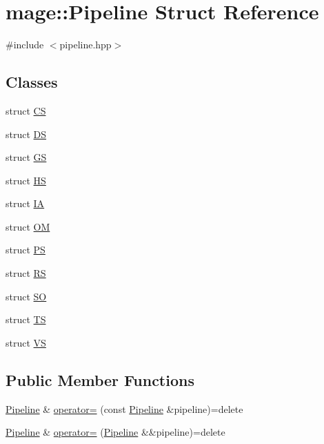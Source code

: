 \hypertarget{structmage_1_1_pipeline}{}\section{mage\+:\+:Pipeline Struct Reference}
\label{structmage_1_1_pipeline}


{\ttfamily \#include $<$pipeline.\+hpp$>$}

\subsection*{Classes}
\begin{DoxyCompactItemize}
\item 
struct \hyperlink{structmage_1_1_pipeline_1_1_c_s}{CS}
\item 
struct \hyperlink{structmage_1_1_pipeline_1_1_d_s}{DS}
\item 
struct \hyperlink{structmage_1_1_pipeline_1_1_g_s}{GS}
\item 
struct \hyperlink{structmage_1_1_pipeline_1_1_h_s}{HS}
\item 
struct \hyperlink{structmage_1_1_pipeline_1_1_i_a}{IA}
\item 
struct \hyperlink{structmage_1_1_pipeline_1_1_o_m}{OM}
\item 
struct \hyperlink{structmage_1_1_pipeline_1_1_p_s}{PS}
\item 
struct \hyperlink{structmage_1_1_pipeline_1_1_r_s}{RS}
\item 
struct \hyperlink{structmage_1_1_pipeline_1_1_s_o}{SO}
\item 
struct \hyperlink{structmage_1_1_pipeline_1_1_t_s}{TS}
\item 
struct \hyperlink{structmage_1_1_pipeline_1_1_v_s}{VS}
\end{DoxyCompactItemize}
\subsection*{Public Member Functions}
\begin{DoxyCompactItemize}
\item 
\hyperlink{structmage_1_1_pipeline}{Pipeline} \& \hyperlink{structmage_1_1_pipeline_a517aa5196bfe4bd84f5f789e277f374e}{operator=} (const \hyperlink{structmage_1_1_pipeline}{Pipeline} \&pipeline)=delete
\item 
\hyperlink{structmage_1_1_pipeline}{Pipeline} \& \hyperlink{structmage_1_1_pipeline_ad2ef272f32b0a792910ff04460753c5d}{operator=} (\hyperlink{structmage_1_1_pipeline}{Pipeline} \&\&pipeline)=delete
\end{DoxyCompactItemize}
